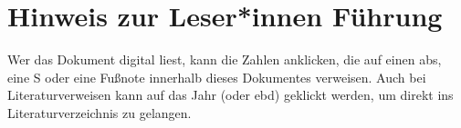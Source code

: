 \maketitle
\clearpage


\section*{Hinweis zur Leser*innen Führung}
Wer das Dokument digital liest, kann die Zahlen anklicken, die auf einen \gls{abs}, eine \gls{S} oder eine Fußnote innerhalb dieses Dokumentes verweisen. 
Auch bei Literaturverweisen kann auf das Jahr (oder \gls{ebd}) geklickt werden, um direkt ins Literaturverzeichnis zu gelangen. 


\clearpage
\newpage

\tableofcontents %


\printacronyms[type=\acronymtype, 
    nonumberlist, 
    title=Abkürzungsverzeichnis, 
    toctitle=Abkürzungsverzeichnis]{} %

\listoffigures %
\listoftables %

\clearpage
\newpage

\setcounter{page}{1}
